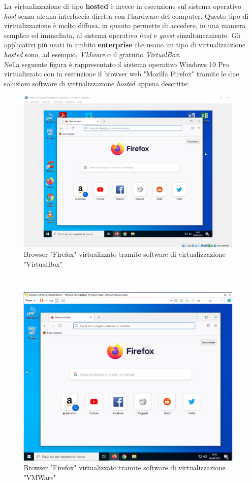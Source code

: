 La virtualizzazione di tipo \textbf{hosted} è invece in esecuzione sul sistema operativo \textit{host} senza alcuna interfaccia diretta con l'hardware del computer. Questo tipo di virtualizzazione è molto diffusa, in quanto permette di accedere, in una maniera semplice ed immediata, al sistema operativo \textit{host} e \textit{guest} simultaneamente. Gli applicativi più usati in ambito \textbf{enterprise} che usano un tipo di virtualizzazione \textit{hosted} sono, ad esempio, \textit{VMware} o il gratuito \textit{VirtualBox}.\\
Nella seguente figura è rappresentato il sistema operativo Windows 10 Pro virtualizzato con in esecuzione il browser web "Mozilla Firefox" tramite le due soluzioni software di virtualizzazione \textit{hosted} appena descritte:
\begin{figure}[!h]     
\centering 
    \includegraphics[width=0.6\columnwidth]{immagini/screenshot/firefox_virtualbox} 
    \caption{Browser "Firefox" virtualizzato tramite software di virtualizzazione "VirtualBox"}
\end{figure} \\

\begin{figure}[!h]     
\centering 
    \includegraphics[width=0.6\columnwidth]{immagini/screenshot/firefox_vmware} 
    \caption{Browser "Firefox" virtualizzato tramite software di virtualizzazione "VMWare"}
\end{figure}

